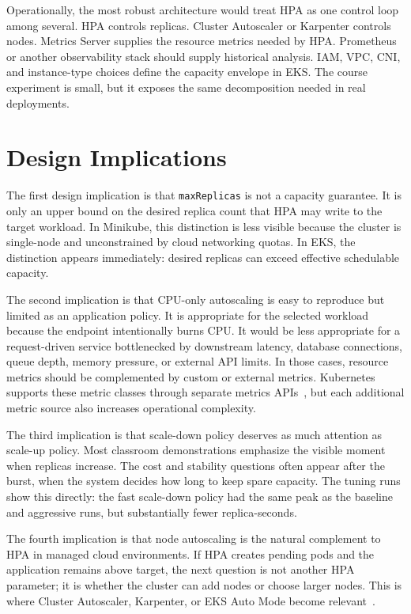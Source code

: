 \documentclass[conference]{IEEEtran}
\begin{document}
Operationally, the most robust architecture would treat HPA as one control loop among several. HPA controls replicas. Cluster Autoscaler or Karpenter controls nodes. Metrics Server supplies the resource metrics needed by HPA. Prometheus or another observability stack should supply historical analysis. IAM, VPC, CNI, and instance-type choices define the capacity envelope in EKS. The course experiment is small, but it exposes the same decomposition needed in real deployments.

\section{Design Implications}

The first design implication is that \texttt{maxReplicas} is not a capacity guarantee. It is only an upper bound on the desired replica count that HPA may write to the target workload. In Minikube, this distinction is less visible because the cluster is single-node and unconstrained by cloud networking quotas. In EKS, the distinction appears immediately: desired replicas can exceed effective schedulable capacity.

The second implication is that CPU-only autoscaling is easy to reproduce but limited as an application policy. It is appropriate for the selected workload because the endpoint intentionally burns CPU. It would be less appropriate for a request-driven service bottlenecked by downstream latency, database connections, queue depth, memory pressure, or external API limits. In those cases, resource metrics should be complemented by custom or external metrics. Kubernetes supports these metric classes through separate metrics APIs~\cite{kubernetes_hpa_concepts}, but each additional metric source also increases operational complexity.

The third implication is that scale-down policy deserves as much attention as scale-up policy. Most classroom demonstrations emphasize the visible moment when replicas increase. The cost and stability questions often appear after the burst, when the system decides how long to keep spare capacity. The tuning runs show this directly: the fast scale-down policy had the same peak as the baseline and aggressive runs, but substantially fewer replica-seconds.

The fourth implication is that node autoscaling is the natural complement to HPA in managed cloud environments. If HPA creates pending pods and the application remains above target, the next question is not another HPA parameter; it is whether the cluster can add nodes or choose larger nodes. This is where Cluster Autoscaler, Karpenter, or EKS Auto Mode become relevant~\cite{aws_eks_autoscaling}.
\end{document}
